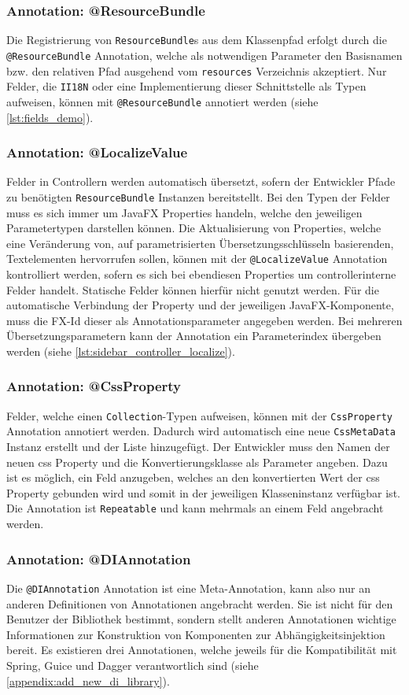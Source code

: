 \subsubsection{Annotation: @ResourceBundle}
Die Registrierung von \texttt{ResourceBundle}s aus dem Klassenpfad erfolgt durch die \texttt{@ResourceBundle} Annotation, welche als notwendigen Parameter den Basisnamen bzw. den relativen Pfad ausgehend vom \texttt{resources} Verzeichnis akzeptiert. Nur Felder, die \texttt{II18N} oder eine Implementierung dieser Schnittstelle als Typen aufweisen, können mit \texttt{@ResourceBundle} annotiert werden (siehe \autoref{lst:fields_demo}).
\subsubsection{Annotation: @LocalizeValue}
Felder in Controllern werden automatisch übersetzt, sofern der Entwickler Pfade zu benötigten \texttt{ResourceBundle} Instanzen bereitstellt. Bei den Typen der Felder muss es sich immer um JavaFX Properties handeln, welche den jeweiligen Parametertypen darstellen können. Die Aktualisierung von Properties, welche eine Veränderung von, auf parametrisierten Übersetzungsschlüsseln basierenden, Textelementen hervorrufen sollen, können mit der \texttt{@LocalizeValue} Annotation kontrolliert werden, sofern es sich bei ebendiesen Properties um controllerinterne Felder handelt. Statische Felder können hierfür nicht genutzt werden. Für die automatische Verbindung der Property und der jeweiligen JavaFX-Komponente, muss die FX-Id dieser als Annotationsparameter angegeben werden. Bei mehreren Übersetzungsparametern kann der Annotation ein Parameterindex übergeben werden (siehe \autoref{lst:sidebar_controller_localize}).
\subsubsection{Annotation: @CssProperty}
Felder, welche einen \texttt{Collection}-Typen aufweisen, können mit der \texttt{CssProperty} Annotation annotiert werden. Dadurch wird automatisch eine neue \texttt{CssMetaData} Instanz erstellt und der Liste hinzugefügt. Der Entwickler muss den Namen der neuen \ac{css} Property und die Konvertierungsklasse als Parameter angeben. Dazu ist es möglich, ein Feld anzugeben, welches an den konvertierten Wert der \ac{css} Property gebunden wird und somit in der jeweiligen Klasseninstanz verfügbar ist. Die Annotation ist \texttt{Repeatable} und kann mehrmals an einem Feld angebracht werden.
\subsubsection{Annotation: @DIAnnotation}
Die \texttt{@DIAnnotation} Annotation ist eine Meta-Annotation, kann also nur an anderen Definitionen von Annotationen angebracht werden. Sie ist nicht für den Benutzer der Bibliothek bestimmt, sondern stellt anderen Annotationen wichtige Informationen zur Konstruktion von Komponenten zur Abhängigkeitsinjektion bereit. Es existieren drei Annotationen, welche jeweils für die Kompatibilität mit Spring, Guice und Dagger verantwortlich sind (siehe \autoref{appendix:add_new_di_library}).
